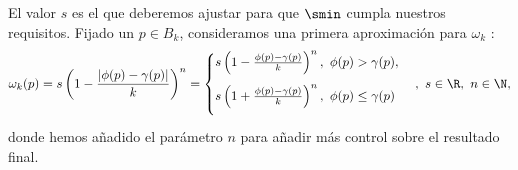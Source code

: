 El valor $s$ es el que deberemos ajustar para que $\smin$ cumpla nuestros requisitos. Fijado un $p\in B_{k}$, consideramos una primera aproximación para $\omega_k$ :
\begin{equation*}
    \omega_k(p) = s\left( 1-\frac{|\phi(p)-\gamma(p)|}{k} \right)^n = \begin{cases}
        s\left( 1-\frac{\phi(p)-\gamma(p)}{k}\right)^n,\ \phi(p)>\gamma(p), \\[10pt]
        s\left( 1+\frac{\phi(p)-\gamma(p)}{k}\right)^n,\ \phi(p)\le \gamma(p)\\[10pt]
    \end{cases}  ,\ s\in\R,\ n\in\N,
\end{equation*}
donde hemos añadido el parámetro $n$ para añadir más control sobre el resultado final.\newline 
